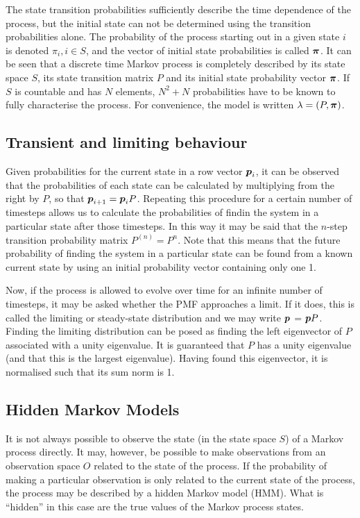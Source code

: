 The state transition probabilities sufficiently describe the time dependence of the process, but the initial state can not be determined using the transition probabilities alone.
The probability of the process starting out in a given state $i$ is denoted $\pi_i, i \in S$, and the vector of initial state probabilities is called
$\boldsymbol{\pi}$.
It can be seen that a discrete time Markov process is completely described by its state space $S$, its state transition matrix $P$ and its initial state probability vector $\boldsymbol{\pi}$.  
If $S$ is countable and has $N$ elements, $N^2 + N$ probabilities have to be known to fully characterise the process.
For convenience, the model is written $\lambda = (P, \boldsymbol{\pi})$.

\subsection{Transient and limiting behaviour}
Given probabilities for the current state in a row vector $\boldsymbol{p}_i$, it can be observed that the probabilities of each state can be calculated by multiplying from the right by $P$, so that $\boldsymbol{p}_{i+1} = \boldsymbol{p}_i P$.
Repeating this procedure for a certain number of timesteps allows us to calculate the probabilities of findin the system in a particular state after those timesteps.
In this way it may be said that the $n$-step transition probability matrix $P^(n) = P^n$.
Note that this means that the future probability of finding the system in a particular state can be found from a known current state by using an initial probability vector containing only one 1.

Now, if the process is allowed to evolve over time for an infinite number of timesteps, it may be asked whether the PMF approaches a limit.
If it does, this is called the limiting or steady-state distribution and we may write $\boldsymbol{p}$ = $\boldsymbol{p}P$.
Finding the limiting distribution can be posed as finding the left eigenvector of $P$ associated with a unity eigenvalue.
It is guaranteed that $P$ has a unity eigenvalue (and that this is the largest eigenvalue).
Having found this eigenvector, it is normalised such that its sum norm is 1.

\subsection{Hidden Markov Models} 
It is not always possible to observe the state (in the state space $S$) of a Markov process directly. 
It may, however, be possible to make observations from an observation space $O$ related to the state of the process.
If the probability of making a particular observation is only related to the current state of the process, the process may be described by a hidden Markov model (HMM).
What is ``hidden'' in this case are the true values of the Markov process states.

